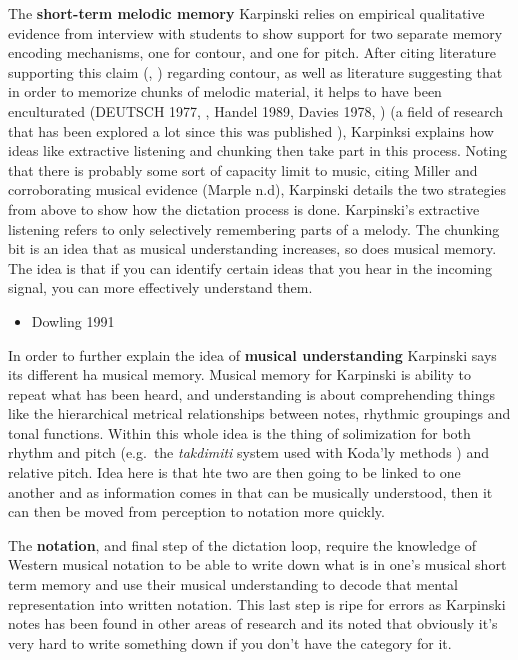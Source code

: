 \documentclass[]{book}
\providecommand{\tightlist}{%
  \setlength{\itemsep}{0pt}\setlength{\parskip}{0pt}}
\theoremstyle{definition}
\theoremstyle{definition}
\theoremstyle{definition}
\theoremstyle{remark}
\begin{document}
The \textbf{short-term melodic memory} Karpinski relies on empirical
qualitative evidence from interview with students to show support for
two separate memory encoding mechanisms, one for contour, and one for
pitch. After citing literature supporting this claim
(\citep{dowlingScaleContourTwo1978},
\citep{dewittRecognitionNovelMelodies1986}) regarding contour, as well
as literature suggesting that in order to memorize chunks of melodic
material, it helps to have been enculturated (DEUTSCH 1977,
\citep{ouraMemoryMelodiesSubjects1988}, Handel 1989, Davies 1978,
\citep{dowlingExpectancyAttentionMelody1990}) (a field of research that
has been explored a lot since this was published
\citep{pearceAuditoryExpectationInformation2012}), Karpinksi explains
how ideas like extractive listening and chunking then take part in this
process. Noting that there is probably some sort of capacity limit to
music, citing Miller \citep{millerMagicalNumberSeven1956} and
corroborating musical evidence (Marple n.d), Karpinski details the two
strategies from above to show how the dictation process is done.
Karpinski's extractive listening refers to only selectively remembering
parts of a melody. The chunking bit is an idea that as musical
understanding increases, so does musical memory. The idea is that if you
can identify certain ideas that you hear in the incoming signal, you can
more effectively understand them.

\begin{itemize}
\tightlist
\item
  Dowling 1991 \citep{dowlingTonalStrengthMelody1991}
\end{itemize}

In order to further explain the idea of \textbf{musical understanding}
Karpinski says its different ha musical memory. Musical memory for
Karpinski is ability to repeat what has been heard, and understanding is
about comprehending things like the hierarchical metrical relationships
between notes, rhythmic groupings and tonal functions. Within this whole
idea is the thing of solimization for both rhythm and pitch (e.g.~the
\emph{takdimiti} system used with Koda'ly methods ) and relative pitch.
Idea here is that hte two are then going to be linked to one another and
as information comes in that can be musically understood, then it can
then be moved from perception to notation more quickly.

The \textbf{notation}, and final step of the dictation loop, require the
knowledge of Western musical notation to be able to write down what is
in one's musical short term memory and use their musical understanding
to decode that mental representation into written notation. This last
step is ripe for errors as Karpinski notes has been found in other areas
of research \citep{taylorStrategiesMemoryShort1983} and its noted that
obviously it's very hard to write something down if you don't have the
category for it.
\end{document}

